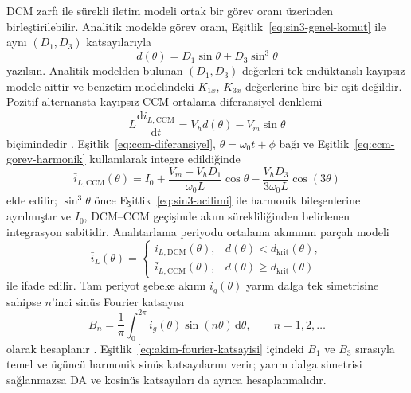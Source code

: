 DCM zarfı ile sürekli iletim modeli ortak bir görev oranı üzerinden birleştirilebilir. Analitik modelde görev oranı, Eşitlik~\eqref{eq:sin3-genel-komut} ile aynı $(D_1,D_3)$ katsayılarıyla
\begin{equation}
  d(\theta)=D_1\sin\theta+D_3\sin^3\theta
  \label{eq:ccm-gorev-harmonik}
\end{equation}
yazılsın. Analitik modelden bulunan $(D_1,D_3)$ değerleri tek endüktanslı kayıpsız modele aittir ve benzetim modelindeki $K_{1x}$, $K_{3x}$ değerlerine bire bir eşit değildir. Pozitif alternansta kayıpsız CCM ortalama diferansiyel denklemi
\begin{equation}
  L\frac{\mathrm{d}\bar i_{L,\mathrm{CCM}}}{\mathrm{d}t}
  =V_h d(\theta)-V_m\sin\theta
  \label{eq:ccm-diferansiyel}
\end{equation}
biçimindedir \citep{Erickson2001,Mohan2003}. Eşitlik~\eqref{eq:ccm-diferansiyel}, $\theta=\omega_0t+\phi$ bağı ve Eşitlik~\eqref{eq:ccm-gorev-harmonik} kullanılarak integre edildiğinde
\begin{equation}
  \bar i_{L,\mathrm{CCM}}(\theta)
  = I_0+\frac{V_m-V_hD_1}{\omega_0L}\cos\theta
  -\frac{V_hD_3}{3\omega_0L}\cos(3\theta)
  \label{eq:ccm-akim-cozumu}
\end{equation}
elde edilir; $\sin^3\theta$ önce Eşitlik~\eqref{eq:sin3-acilimi} ile harmonik bileşenlerine ayrılmıştır ve $I_0$, DCM--CCM geçişinde akım sürekliliğinden belirlenen integrasyon sabitidir. Anahtarlama periyodu ortalama akımının parçalı modeli
\begin{equation}
  \bar i_L(\theta)=
  \begin{cases}
    \bar i_{L,\mathrm{DCM}}(\theta), & d(\theta)<d_{\mathrm{krit}}(\theta),\\
    \bar i_{L,\mathrm{CCM}}(\theta), & d(\theta)\geq d_{\mathrm{krit}}(\theta)
  \end{cases}
  \label{eq:dcm-ccm-parcali-model}
\end{equation}
ile ifade edilir. Tam periyot şebeke akımı $i_g(\theta)$ yarım dalga tek simetrisine sahipse $n$'inci sinüs Fourier katsayısı
\begin{equation}
  B_n=\frac{1}{\pi}\int_0^{2\pi}i_g(\theta)\sin(n\theta)\,\mathrm{d}\theta,
  \qquad n=1,2,\ldots
  \label{eq:akim-fourier-katsayisi}
\end{equation}
olarak hesaplanır \citep{Oppenheim1997}. Eşitlik~\eqref{eq:akim-fourier-katsayisi} içindeki $B_1$ ve $B_3$ sırasıyla temel ve üçüncü harmonik sinüs katsayılarını verir; yarım dalga simetrisi sağlanmazsa DA ve kosinüs katsayıları da ayrıca hesaplanmalıdır.

